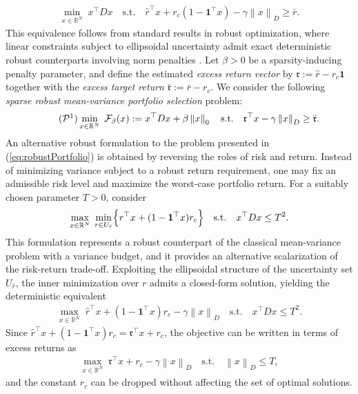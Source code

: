 \documentclass[11pt]{article}
\theoremstyle{plain}
\theoremstyle{definition}
\theoremstyle{plain}
\newcommand{\one}{{\mathbf 1}} %
\newcommand{\RR}{{\mathbb R}} %
\newcommand{\norm}[1]{\left\lVert#1\right\rVert}
\newcommand{\tpose}[1]{#1^{\top}}
\newcommand{\cF}{{\mathcal F}}
\newcommand{\cP}{{\mathcal P}}
\newcommand{\ccr}{{\mathfrak r}}
\begin{document}
\begin{align}
\label{eq:robustPortfolio}
\min_{x\in\mathbb{R}^N} \; \tpose{x}D x
\quad \text{s.t.} \quad
\tpose{\hat{r}} x + r_c(1-\tpose{\one} x) - \gamma \norm{x}_D \geq \bar r.
\end{align}
This equivalence follows from standard results in robust optimization, where linear constraints subject to ellipsoidal uncertainty admit exact deterministic robust counterparts involving norm penalties \cite{GoldfarbIyengar2003,BenTalNemirovski2009}.
Let $\beta>0$ be a sparsity-inducing penalty parameter, and define the estimated \emph{excess return vector} by
$\ccr := \hat{r} - r_c \one$ together with the \emph{excess target return} $\bar{\ccr} := \bar{r} - r_c$.
We consider the following \emph{sparse robust mean-variance portfolio selection} problem:
\begin{align}
\tag{$\cP^1$}\label{prob:cprmvp}
\min_{x\in\RR^N} \; \cF_\beta(x):= \tpose{x} D x + \beta \norm{x}_0
\quad \text{s.t.} \quad
\tpose{\ccr} x - \gamma \norm{x}_D \ge \bar{\ccr}.
\end{align}
An alternative robust formulation to the problem presented in (\ref{eq:robustPortfolio}) is obtained by reversing the roles of risk and return. Instead of minimizing variance subject to a robust return requirement, one may fix an admissible risk level and maximize the worst-case portfolio return. For a suitably chosen parameter $T>0$, consider
\begin{align*}
\max_{x\in\RR^N} \;
\min_{r\in U_{\hat{r}}} \Bigl\{ \tpose{r} x + (1-\tpose{\one} x) r_c \Bigr\}
\quad \text{s.t.} \quad
\tpose{x} D x \leq T^2 .
\end{align*}
This formulation represents a robust counterpart of the classical mean-variance problem with a variance budget, and it provides an alternative scalarization of the risk-return trade-off.
Exploiting the ellipsoidal structure of the uncertainty set $U_{\hat{r}}$, the inner minimization over $r$ admits a closed-form solution, yielding the deterministic equivalent
\begin{align*}
\max_{x\in\RR^N} \;
\tpose{\hat{r}} x + (1-\tpose{\one} x) r_c - \gamma \norm{x}_D
\quad \text{s.t.} \quad
\tpose{x} D x \leq T^2.
\end{align*}
Since $\tpose{\hat{r}} x + (1-\tpose{\one} x) r_c=\tpose{\ccr}x+r_c$, the objective can be written in terms of excess returns as
\begin{align*}
\max_{x\in\RR^N} \;
\tpose{\ccr} x + r_c - \gamma \norm{x}_D
\quad \text{s.t.} \quad
\norm{x}_D \leq T ,
\end{align*}
and the constant $r_c$ can be dropped without affecting the set of optimal solutions.
\end{document}
